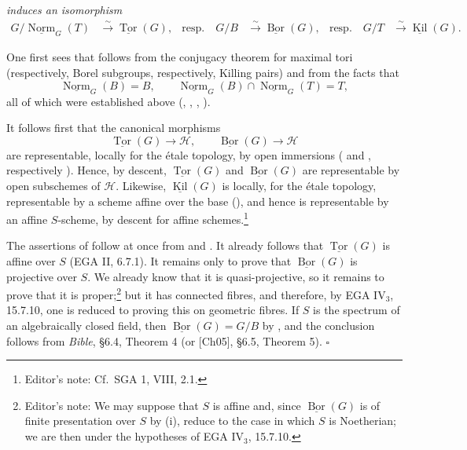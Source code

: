 {\itshape induces an isomorphism}
\[
\begin{aligned}
  G/\underline{\operatorname{Norm}}_G(T)
  &\xrightarrow{\;\sim\;}
  \underline{\operatorname{Tor}}(G),
  &\text{resp.}\quad
  G/B
  &\xrightarrow{\;\sim\;}
  \underline{\operatorname{Bor}}(G),
  &\text{resp.}\quad
  G/T
  &\xrightarrow{\;\sim\;}
  \underline{\operatorname{Kil}}(G).
\end{aligned}
\]

One first sees that \textup{} follows from the conjugacy theorem
for maximal tori \textup{(respectively, Borel subgroups, respectively,
Killing pairs)} and from the facts that
\[
  \underline{\operatorname{Norm}}_G(B)=B,
  \qquad
  \underline{\operatorname{Norm}}_G(B)
  \cap
  \underline{\operatorname{Norm}}_G(T)=T,
\]
all of which were established above \textup{(, , ,
)}.

It follows first that the canonical morphisms
\[
  \underline{\operatorname{Tor}}(G)\longrightarrow\mathcal H,
  \qquad
  \underline{\operatorname{Bor}}(G)\longrightarrow\mathcal H
\]
are representable, locally for the étale topology, by open immersions
\textup{( and , respectively )}. Hence, by descent,
\(\underline{\operatorname{Tor}}(G)\) and
\(\underline{\operatorname{Bor}}(G)\) are representable by open
subschemes of \(\mathcal H\). Likewise,
\(\underline{\operatorname{Kil}}(G)\) is locally, for the étale
topology, representable by a scheme affine over the base
\textup{()}, and hence is representable by an affine
\(S\)-scheme, by descent for affine schemes.\footnote{Editor's note:
Cf.\ SGA 1, VIII, 2.1.}

The assertions of \textup{} follow at once from \textup{}
and . It already follows that
\(\underline{\operatorname{Tor}}(G)\) is affine over \(S\)
\textup{(EGA II, 6.7.1)}. It remains only to prove that
\(\underline{\operatorname{Bor}}(G)\) is projective over \(S\). We
already know that it is quasi-projective, so it remains to prove that
it is proper;\footnote{Editor's note: We may suppose that \(S\) is
affine and, since \(\underline{\operatorname{Bor}}(G)\) is of finite
presentation over \(S\) by \textup{(i)}, reduce to the case in which
\(S\) is Noetherian; we are then under the hypotheses of EGA
IV\(_3\), 15.7.10.} but it has connected fibres, and therefore, by EGA
IV\(_3\), 15.7.10, one is reduced to proving this on geometric fibres.
If \(S\) is the spectrum of an algebraically closed field, then
\(\underline{\operatorname{Bor}}(G)=G/B\) by \textup{}, and the
conclusion follows from \emph{Bible}, \S6.4, Theorem 4
\textup{(or [Ch05], \S6.5, Theorem 5)}.
\hfill\(\square\)


